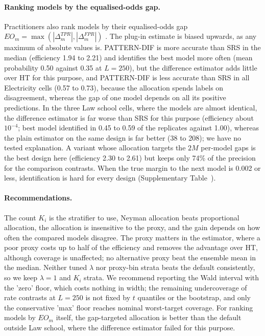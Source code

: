 \paragraph{Ranking models by the equalised-odds gap.} Practitioners also rank models by their equalised-odds gap $EO_m=\max(|\Delta^{TPR}_m|,|\Delta^{FPR}_m|)$ \citep{hardt2016}. The plug-in estimate is biased upwards, as any maximum of absolute values is. PATTERN-DIF is more accurate than SRS in the median (efficiency 1.94 to 2.21) and identifies the best model more often (mean probability 0.50 against 0.35 at $L=250$), but the difference estimator adds little over HT for this purpose, and PATTERN-DIF is less accurate than SRS in all Electricity cells (0.57 to 0.73), because the allocation spends labels on disagreement, whereas the gap of one model depends on all its positive predictions. In the three Law school cells, where the models are almost identical, the difference estimator is far worse than SRS for this purpose (efficiency about $10^{-4}$; best model identified in 0.45 to 0.59 of the replicates against 1.00), whereas the plain estimator on the same design is far better (38 to 208); we have no tested explanation. A variant whose allocation targets the $2M$ per-model gaps is the best design here (efficiency 2.30 to 2.61) but keeps only 74\% of the precision for the comparison contrasts. When the true margin to the next model is 0.002 or less, identification is hard for every design (Supplementary Table~).

\paragraph{Recommendations.} The count $K_i$ is the stratifier to use, Neyman allocation beats proportional allocation, the allocation is insensitive to the proxy, and the gain depends on how often the compared models disagree. The proxy matters in the estimator, where a poor proxy costs up to half of the efficiency and removes the advantage over HT, although coverage is unaffected; no alternative proxy beat the ensemble mean in the median. Neither tuned $\lambda$ nor proxy-bin strata beats the default consistently, so we keep $\lambda=1$ and $K_i$ strata. We recommend reporting the Wald interval with the 'zero' floor, which costs nothing in width; the remaining undercoverage of rate contrasts at $L=250$ is not fixed by $t$ quantiles or the bootstrap, and only the conservative 'max' floor reaches nominal worst-target coverage. For ranking models by $EO_m$ itself, the gap-targeted allocation is better than the default outside Law school, where the difference estimator failed for this purpose.
